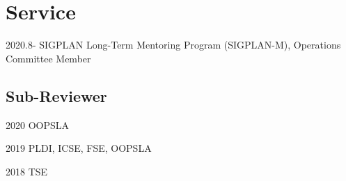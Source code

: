 \documentclass[12pt,letterpaper]{report}
\newcommand{\listitemspace}{0.15em}
\renewenvironment{itemize}
{\begin{list}{}{\setlength{\leftmargin}{0em}
			\setlength{\parskip}{0em}
			\setlength{\itemsep}{\listitemspace}
			\setlength{\parsep}{\listitemspace}}}
	{\end{list}}
\begin{document}
\vspace{-0.5em}
\section*{Service}
\begin{tablist}
	\item[2020.8-] \tab SIGPLAN Long-Term Mentoring Program (SIGPLAN-M), Operations Committee Member
\end{tablist}

\subsection*{Sub-Reviewer}
\begin{tablist}
	\item[2020] \tab OOPSLA
	\item[2019] \tab PLDI, ICSE, FSE, OOPSLA
	\item[2018] \tab TSE
\end{tablist}


%
%
%
%
%
%
%
%
%
%
%
\end{document}
